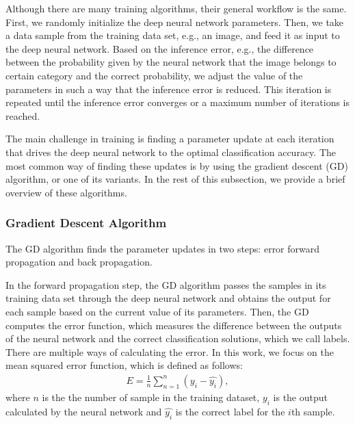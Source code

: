 \documentclass[conference]{IEEEtran}
\begin{document}
Although there are many training algorithms, their general workflow is the same. 
First, we randomly initialize the deep neural network parameters.
Then, we take a data sample from the training data set, e.g., an image, and feed it as input to the deep neural network. Based on the
inference error, e.g., the difference between the probability given by the neural network that the image belongs to certain category
and the correct probability, we adjust the value of the parameters in such a way that the inference error is reduced. This iteration is
repeated until the inference error converges or a maximum number of iterations is reached. 



The main challenge in training is finding a parameter update at each iteration that drives the deep neural network to the optimal
classification accuracy. The most common way of finding these updates is by using the gradient descent (GD) algorithm, or one of its
variants. In the rest of this subsection, we provide a brief overview of these algorithms. 

\subsubsection{Gradient Descent Algorithm}
The GD algorithm finds the parameter updates in two steps: error forward propagation and back propagation. 

In the forward propagation step, the GD algorithm passes the samples in its training data set through the
deep neural network and obtains the output for each sample based on the current value of its parameters. Then, the GD computes the
error function, which measures the difference between the outputs of the neural network and the correct classification solutions,
which we call labels. There are multiple ways of calculating the error. In this work, we focus on the mean squared error function,
which is defined as follows:
\begin{align}\label{eq:errorFunction}
 E= \frac{1}{n} \sum_{n=1}^{n}(y_i -\hat{y_i}),
\end{align}
where $n$ is the the number of sample in the training dataset, $y_i$ is the output calculated by the neural network and 
$\hat{y_i}$ is the correct label for the $i$th sample.
\end{document}
